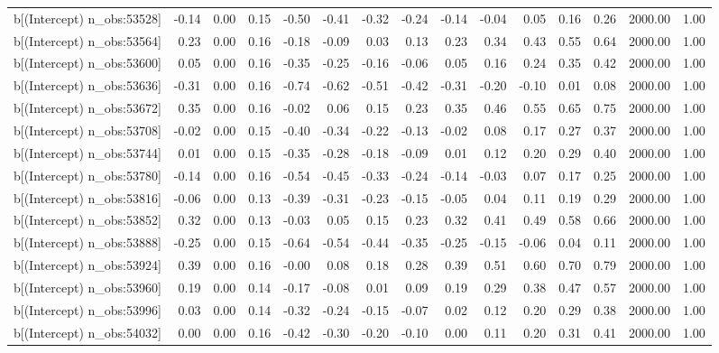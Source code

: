 \begin{table}[ht]
\begin{tabular}{rrrrrrrrrrrrrrr}
  b[(Intercept) n\_obs:53528] & -0.14 & 0.00 & 0.15 & -0.50 & -0.41 & -0.32 & -0.24 & -0.14 & -0.04 & 0.05 & 0.16 & 0.26 & 2000.00 & 1.00 \\ 
  b[(Intercept) n\_obs:53564] & 0.23 & 0.00 & 0.16 & -0.18 & -0.09 & 0.03 & 0.13 & 0.23 & 0.34 & 0.43 & 0.55 & 0.64 & 2000.00 & 1.00 \\ 
  b[(Intercept) n\_obs:53600] & 0.05 & 0.00 & 0.16 & -0.35 & -0.25 & -0.16 & -0.06 & 0.05 & 0.16 & 0.24 & 0.35 & 0.42 & 2000.00 & 1.00 \\ 
  b[(Intercept) n\_obs:53636] & -0.31 & 0.00 & 0.16 & -0.74 & -0.62 & -0.51 & -0.42 & -0.31 & -0.20 & -0.10 & 0.01 & 0.08 & 2000.00 & 1.00 \\ 
  b[(Intercept) n\_obs:53672] & 0.35 & 0.00 & 0.16 & -0.02 & 0.06 & 0.15 & 0.23 & 0.35 & 0.46 & 0.55 & 0.65 & 0.75 & 2000.00 & 1.00 \\ 
  b[(Intercept) n\_obs:53708] & -0.02 & 0.00 & 0.15 & -0.40 & -0.34 & -0.22 & -0.13 & -0.02 & 0.08 & 0.17 & 0.27 & 0.37 & 2000.00 & 1.00 \\ 
  b[(Intercept) n\_obs:53744] & 0.01 & 0.00 & 0.15 & -0.35 & -0.28 & -0.18 & -0.09 & 0.01 & 0.12 & 0.20 & 0.29 & 0.40 & 2000.00 & 1.00 \\ 
  b[(Intercept) n\_obs:53780] & -0.14 & 0.00 & 0.16 & -0.54 & -0.45 & -0.33 & -0.24 & -0.14 & -0.03 & 0.07 & 0.17 & 0.25 & 2000.00 & 1.00 \\ 
  b[(Intercept) n\_obs:53816] & -0.06 & 0.00 & 0.13 & -0.39 & -0.31 & -0.23 & -0.15 & -0.05 & 0.04 & 0.11 & 0.19 & 0.29 & 2000.00 & 1.00 \\ 
  b[(Intercept) n\_obs:53852] & 0.32 & 0.00 & 0.13 & -0.03 & 0.05 & 0.15 & 0.23 & 0.32 & 0.41 & 0.49 & 0.58 & 0.66 & 2000.00 & 1.00 \\ 
  b[(Intercept) n\_obs:53888] & -0.25 & 0.00 & 0.15 & -0.64 & -0.54 & -0.44 & -0.35 & -0.25 & -0.15 & -0.06 & 0.04 & 0.11 & 2000.00 & 1.00 \\ 
  b[(Intercept) n\_obs:53924] & 0.39 & 0.00 & 0.16 & -0.00 & 0.08 & 0.18 & 0.28 & 0.39 & 0.51 & 0.60 & 0.70 & 0.79 & 2000.00 & 1.00 \\ 
  b[(Intercept) n\_obs:53960] & 0.19 & 0.00 & 0.14 & -0.17 & -0.08 & 0.01 & 0.09 & 0.19 & 0.29 & 0.38 & 0.47 & 0.57 & 2000.00 & 1.00 \\ 
  b[(Intercept) n\_obs:53996] & 0.03 & 0.00 & 0.14 & -0.32 & -0.24 & -0.15 & -0.07 & 0.02 & 0.12 & 0.20 & 0.29 & 0.38 & 2000.00 & 1.00 \\ 
  b[(Intercept) n\_obs:54032] & 0.00 & 0.00 & 0.16 & -0.42 & -0.30 & -0.20 & -0.10 & 0.00 & 0.11 & 0.20 & 0.31 & 0.41 & 2000.00 & 1.00 \\ 

\end{tabular}
\end{table}
